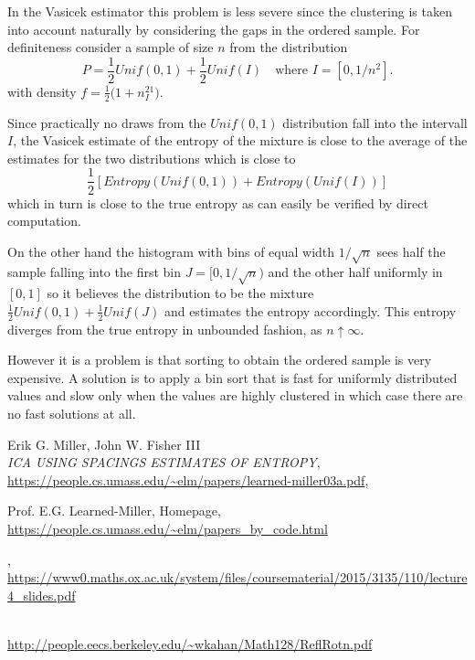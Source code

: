 \documentclass[
10pt,
fleqn,
nosumlimits,
nointlimits,
nonamelimits
]
{article}
\begin{document}
In the Vasicek estimator this problem is less severe since the clustering is taken into account naturally by
considering the gaps in the ordered sample. For definiteness consider a sample of size $n$ from the distribution
$$
P=\frac{1}{2}Unif(0,1)+\frac{1}{2}Unif(I)\quad\text{where }I=\left[0,1/n^2\right].
$$
with density $f=\frac{1}{2}\big(1+n^21_I)$.

Since practically no draws from the $Unif(0,1)$ distribution fall into the intervall $I$, the Vasicek
estimate of the entropy of the mixture is close to the average of the estimates for the two distributions 
which is close
to 
$$
\frac{1}{2}\left[Entropy(Unif(0,1))+Entropy(Unif(I))\right]
$$
which in turn is close to the true entropy as can easily be verified by direct computation. 

On the other hand the histogram with bins of equal width $1/\sqrt{n}$ sees half
the sample falling into the first bin $J=[0,1/\sqrt{n})$ and the other half uniformly in $[0,1]$ so it believes
the distribution to be the mixture $\tfrac{1}{2}Unif(0,1)+\tfrac{1}{2}Unif(J)$ and estimates the entropy accordingly.
This entropy diverges from the true entropy in unbounded fashion, as $n\uparrow\infty$.

However it is a problem is that sorting to obtain the ordered sample is very expensive. A solution is to apply a bin sort 
that is fast for uniformly distributed values and slow only when the values are highly clustered in which case there are no 
fast solutions at all. 







\begin{thebibliography}{4}

Erik G. Miller, John W. Fisher III\\
\textit{ICA USING SPACINGS ESTIMATES OF ENTROPY},\\
\url{https://people.cs.umass.edu/~elm/papers/learned-miller03a.pdf},


 Prof. E.G. Learned-Miller, Homepage,\\ 
\url{https://people.cs.umass.edu/~elm/papers_by_code.html}

,\\
\url{https://www0.maths.ox.ac.uk/system/files/coursematerial/2015/3135/110/lecture4_slides.pdf}

\\
\url{http://people.eecs.berkeley.edu/~wkahan/Math128/ReflRotn.pdf}

\end{thebibliography}
\end{document}
